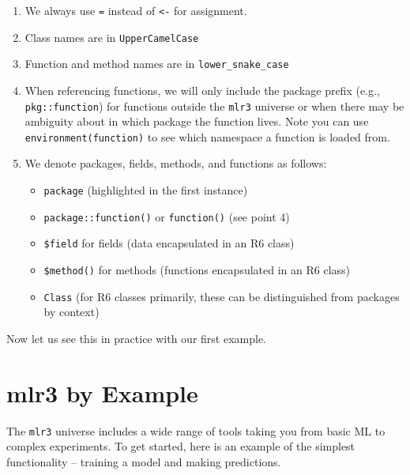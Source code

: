 \begin{enumerate}
\def\labelenumi{\arabic{enumi}.}
\item
  We always use \texttt{=} instead of \texttt{\textless{}-} for
  assignment.
\item
  Class names are in \texttt{UpperCamelCase}
\item
  Function and method names are in \texttt{lower\_snake\_case}
\item
  When referencing functions, we will only include the package prefix
  (e.g., \texttt{pkg::function}) for functions outside the \texttt{mlr3}
  universe or when there may be ambiguity about in which package the
  function lives. Note you can use \texttt{environment(function)} to see
  which namespace a function is loaded from.
\item
  We denote packages, fields, methods, and functions as follows:

  \begin{itemize}
  \tightlist
  \item
    \texttt{package} (highlighted in the first instance)
  \item
    \texttt{package::function()} or \texttt{function()} (see point 4)
  \item
    \texttt{\$field} for fields (data encapsulated in an R6 class)
  \item
    \texttt{\$method()} for methods (functions encapsulated in an R6
    class)
  \item
    \texttt{Class} (for R6 classes primarily, these can be distinguished
    from packages by context)
  \end{itemize}
\end{enumerate}

Now let us see this in practice with our first example.

\hypertarget{mlr3-by-example}{%
\section{mlr3 by Example}\label{mlr3-by-example}}

The \texttt{mlr3} universe includes a wide range of tools taking you
from basic ML to complex experiments. To get started, here is an example
of the simplest functionality -- training a model and making
predictions.

\begin{Shaded}
\begin{Highlighting}[]
\OtherTok{=} \NormalTok{(}\NormalTok{)}
\OtherTok{=} 
\OtherTok{=} \NormalTok{(}\NormalTok{)}

\SpecialCharTok{$}\SpecialCharTok{$}
\SpecialCharTok{$}
\end{Highlighting}
\end{Shaded}

